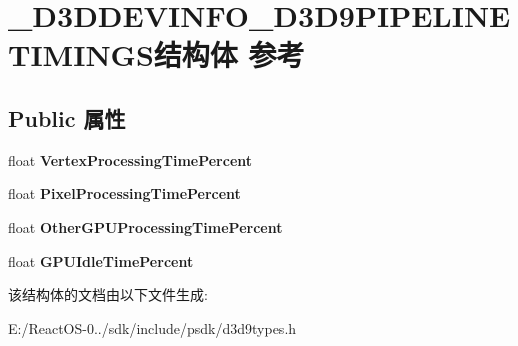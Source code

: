 \hypertarget{struct___d3_d_d_e_v_i_n_f_o___d3_d9_p_i_p_e_l_i_n_e_t_i_m_i_n_g_s}{}\section{\+\_\+\+D3\+D\+D\+E\+V\+I\+N\+F\+O\+\_\+\+D3\+D9\+P\+I\+P\+E\+L\+I\+N\+E\+T\+I\+M\+I\+N\+G\+S结构体 参考}
\label{struct___d3_d_d_e_v_i_n_f_o___d3_d9_p_i_p_e_l_i_n_e_t_i_m_i_n_g_s}
\subsection*{Public 属性}
\begin{DoxyCompactItemize}
\item 
\mbox{\label{struct___d3_d_d_e_v_i_n_f_o___d3_d9_p_i_p_e_l_i_n_e_t_i_m_i_n_g_s_a9acb2bf112879ffcc0a002456d2868f1}} 
float {\bfseries Vertex\+Processing\+Time\+Percent}
\item 
\mbox{\label{struct___d3_d_d_e_v_i_n_f_o___d3_d9_p_i_p_e_l_i_n_e_t_i_m_i_n_g_s_aff58b20cdb4e56834778d22d8b4f9f8b}} 
float {\bfseries Pixel\+Processing\+Time\+Percent}
\item 
\mbox{\label{struct___d3_d_d_e_v_i_n_f_o___d3_d9_p_i_p_e_l_i_n_e_t_i_m_i_n_g_s_af2c5c04534c884ce59d5994ed73ceed1}} 
float {\bfseries Other\+G\+P\+U\+Processing\+Time\+Percent}
\item 
\mbox{\label{struct___d3_d_d_e_v_i_n_f_o___d3_d9_p_i_p_e_l_i_n_e_t_i_m_i_n_g_s_af0caeb32132563a93a36e902e73921d3}} 
float {\bfseries G\+P\+U\+Idle\+Time\+Percent}
\end{DoxyCompactItemize}


该结构体的文档由以下文件生成\+:\begin{DoxyCompactItemize}
\item 
E\+:/\+React\+O\+S-\/0../sdk/include/psdk/d3d9types.\+h\end{DoxyCompactItemize}
